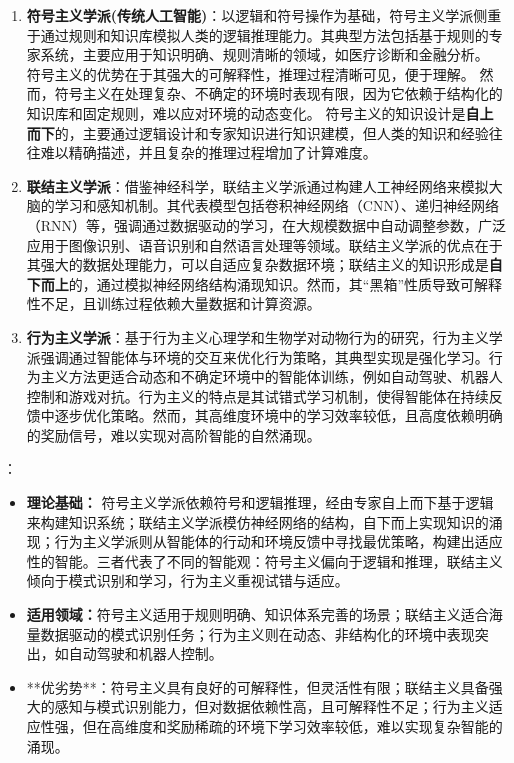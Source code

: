 \begin{enumerate}
\item {\bf 符号主义学派(传统人工智能)}：以逻辑和符号操作为基础，符号主义学派侧重于通过规则和知识库模拟人类的逻辑推理能力。其典型方法包括基于规则的专家系统，主要应用于知识明确、规则清晰的领域，如医疗诊断和金融分析。
 符号主义的优势在于其强大的可解释性，推理过程清晰可见，便于理解。
 然而，符号主义在处理复杂、不确定的环境时表现有限，因为它依赖于结构化的知识库和固定规则，难以应对环境的动态变化。
 符号主义的知识设计是{\bf 自上而下}的，主要通过逻辑设计和专家知识进行知识建模，但人类的知识和经验往往难以精确描述，并且复杂的推理过程增加了计算难度。

\item {\bf 联结主义学派}：借鉴神经科学，联结主义学派通过构建人工神经网络来模拟大脑的学习和感知机制。其代表模型包括卷积神经网络（CNN）、递归神经网络（RNN）等，强调通过数据驱动的学习，在大规模数据中自动调整参数，广泛应用于图像识别、语音识别和自然语言处理等领域。联结主义学派的优点在于其强大的数据处理能力，可以自适应复杂数据环境；联结主义的知识形成是{\bf 自下而上}的，通过模拟神经网络结构涌现知识。然而，其“黑箱”性质导致可解释性不足，且训练过程依赖大量数据和计算资源。

\item {\bf 行为主义学派}：基于行为主义心理学和生物学对动物行为的研究，行为主义学派强调通过智能体与环境的交互来优化行为策略，其典型实现是强化学习。行为主义方法更适合动态和不确定环境中的智能体训练，例如自动驾驶、机器人控制和游戏对抗。行为主义的特点是其试错式学习机制，使得智能体在持续反馈中逐步优化策略。然而，其高维度环境中的学习效率较低，且高度依赖明确的奖励信号，难以实现对高阶智能的自然涌现。
\end{enumerate}

：
\begin{itemize}
    \item{\bf 理论基础：}
   符号主义学派依赖符号和逻辑推理，经由专家自上而下基于逻辑来构建知识系统；联结主义学派模仿神经网络的结构，自下而上实现知识的涌现；行为主义学派则从智能体的行动和环境反馈中寻找最优策略，构建出适应性的智能。三者代表了不同的智能观：符号主义偏向于逻辑和推理，联结主义倾向于模式识别和学习，行为主义重视试错与适应。
 
  \item {\bf 适用领域：}符号主义适用于规则明确、知识体系完善的场景；联结主义适合海量数据驱动的模式识别任务；行为主义则在动态、非结构化的环境中表现突出，如自动驾驶和机器人控制。

\item **优劣势**：符号主义具有良好的可解释性，但灵活性有限；联结主义具备强大的感知与模式识别能力，但对数据依赖性高，且可解释性不足；行为主义适应性强，但在高维度和奖励稀疏的环境下学习效率较低，难以实现复杂智能的涌现。
\end{itemize}

